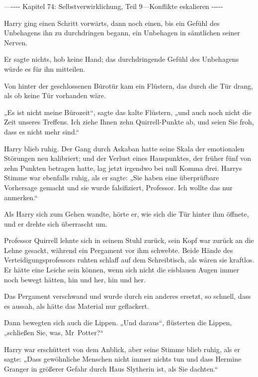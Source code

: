 

\hypertarget{selbstverwirklichung-teil-9-konflikte-eskalieren}{%

—\/-\/-\/-\/- Kapitel 74: Selbstverwirklichung, Teil 9—Konflikte eskalieren -\/-\/-\/-\/-

Harry ging einen Schritt vorwärts, dann noch einen, bis ein Gefühl des Unbehagens ihn zu durchdringen begann, ein Unbehagen in sämtlichen seiner Nerven.

Er sagte nichts, hob keine Hand; das durchdringende Gefühl des Unbehagens würde es für ihn mitteilen.

Von hinter der geschlossenen Bürotür kam ein Flüstern, das durch die Tür drang, als ob keine Tür vorhanden wäre.

„Es ist nicht meine Bürozeit“, sagte das kalte Flüstern, „und auch noch nicht die Zeit unseres Treffens. Ich ziehe Ihnen zehn Quirrell-Punkte ab, und seien Sie froh, dass es nicht mehr sind.“

Harry blieb ruhig. Der Gang durch Askaban hatte seine Skala der emotionalen Störungen neu kalibriert; und der Verlust eines Hauspunktes, der früher fünf von zehn Punkten betragen hatte, lag jetzt irgendwo bei null Komma drei. Harrys Stimme war ebenfalls ruhig, als er sagte: „Sie haben eine überprüfbare Vorhersage gemacht und sie wurde falsifiziert, Professor. Ich wollte das nur anmerken.“

Als Harry sich zum Gehen wandte, hörte er, wie sich die Tür hinter ihm öffnete, und er drehte sich überrascht um.

Professor Quirrell lehnte sich in seinem Stuhl zurück, sein Kopf war zurück an die Lehne gesackt, während ein Pergament vor ihm schwebte. Beide Hände des Verteidigungsprofessors ruhten schlaff auf dem Schreibtisch, als wären sie kraftlos. Er hätte eine Leiche sein können, wenn sich nicht die eisblauen Augen immer noch bewegt hätten, hin und her, hin und her.

Das Pergament verschwand und wurde durch ein anderes ersetzt, so schnell, dass es aussah, als hätte das Material nur geflackert.

Dann bewegten sich auch die Lippen. „Und daraus“, flüsterten die Lippen, „schließen Sie, was, Mr~Potter?“

Harry war erschüttert von dem Anblick, aber seine Stimme blieb ruhig, als er sagte: „Dass gewöhnliche Menschen nicht immer nichts tun und dass Hermine Granger in größerer Gefahr durch Haus Slytherin ist, als Sie dachten.“

}
